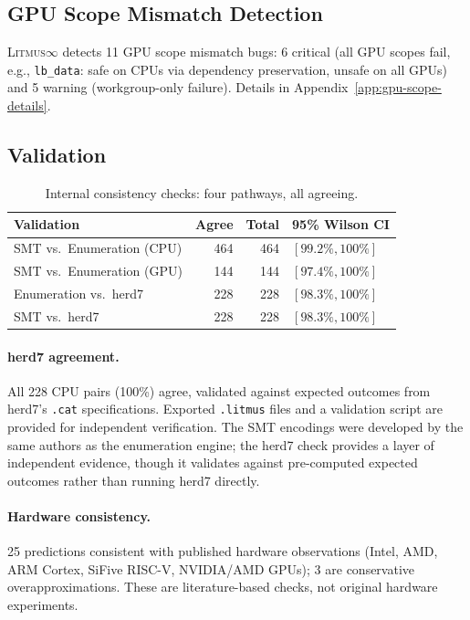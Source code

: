 \documentclass[11pt]{article}
\newcommand{\litmus}{\textsc{Litmus$\infty$}}
\begin{document}
\subsection{GPU Scope Mismatch Detection}
\label{sec:gpu-scope}

\litmus{} detects 11 GPU scope mismatch bugs: 6 critical (all GPU
scopes fail, e.g., \texttt{lb\_data}: safe on CPUs via dependency
preservation, unsafe on all GPUs) and 5 warning (workgroup-only
failure). Details in Appendix~\ref{app:gpu-scope-details}.

\subsection{Validation}
\label{sec:validation}

\begin{table}[ht]
\centering
\caption{Internal consistency checks: four pathways, all agreeing.}
\label{tab:validation}
\small
\begin{tabular}{lrrl}
\toprule
\textbf{Validation} & \textbf{Agree} & \textbf{Total} & \textbf{95\% Wilson CI} \\
\midrule
SMT vs.\ Enumeration (CPU) & 464 & 464 & $[99.2\%, 100\%]$ \\
SMT vs.\ Enumeration (GPU) & 144 & 144 & $[97.4\%, 100\%]$ \\
Enumeration vs.\ herd7     & 228 & 228 & $[98.3\%, 100\%]$ \\
SMT vs.\ herd7             & 228 & 228 & $[98.3\%, 100\%]$ \\
\bottomrule
\end{tabular}
\end{table}

\paragraph{herd7 agreement.}
All 228 CPU pairs (100\%) agree, validated against expected outcomes
from herd7's \texttt{.cat} specifications.
Exported \texttt{.litmus} files and a validation script
are provided for independent verification.
The SMT encodings were developed by the same authors as the
enumeration engine; the herd7 check provides a layer of
independent evidence, though it validates against pre-computed
expected outcomes rather than running herd7 directly.

\paragraph{Hardware consistency.}
25 predictions consistent with published hardware observations
(Intel, AMD, ARM Cortex, SiFive RISC-V, NVIDIA/AMD GPUs);
3 are conservative overapproximations. These are literature-based
checks, not original hardware experiments.
\end{document}
